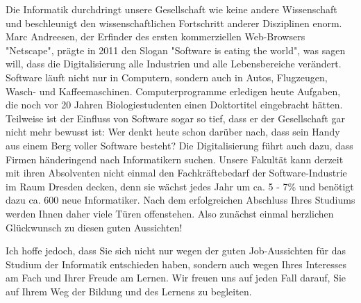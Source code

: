 Die Informatik durchdringt unsere Gesellschaft wie keine andere Wissenschaft und beschleunigt den wissenschaftlichen Fortschritt anderer Disziplinen enorm. Marc Andreesen, der Erfinder des ersten kommerziellen Web-Browsers "Netscape", prägte in 2011 den Slogan "Software is eating the world", was sagen will, dass die Digitalisierung alle Industrien und alle Lebensbereiche verändert. Software läuft nicht nur in Computern, sondern auch in Autos, Flugzeugen, Wasch- und Kaffeemaschinen. Computerprogramme erledigen heute Aufgaben, die noch vor 20 Jahren Biologiestudenten einen Doktortitel eingebracht hätten. Teilweise ist der Einfluss von Software sogar so tief, dass er der Gesellschaft gar nicht mehr bewusst ist: Wer denkt heute schon darüber nach, dass sein Handy aus einem Berg voller Software besteht? Die Digitalisierung führt auch dazu, dass Firmen händeringend nach Informatikern suchen. Unsere Fakultät kann derzeit mit ihren Absolventen nicht einmal den Fachkräftebedarf der Software-Industrie im Raum Dresden decken, denn sie wächst jedes Jahr um ca. 5 - 7\% und benötigt dazu ca. 600 neue Informatiker. Nach dem erfolgreichen Abschluss Ihres Studiums werden Ihnen daher viele Türen offenstehen. Also zunächst einmal herzlichen Glückwunsch zu diesen guten Aussichten!

Ich hoffe jedoch, dass Sie sich nicht nur wegen der guten Job-Aussichten für das Studium der Informatik entschieden haben, sondern auch wegen Ihres Interesses am Fach und Ihrer Freude am Lernen. Wir freuen uns auf jeden Fall darauf, Sie auf Ihrem Weg der Bildung und des Lernens zu begleiten.

